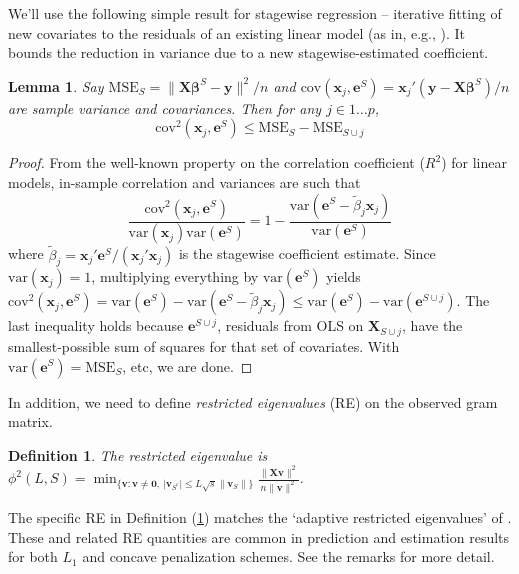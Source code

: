 \documentclass[12pt]{article}
\newtheorem{definition}{\sc Definition}[section]
\newtheorem{lemma}{\sc Lemma}[section]
\newcommand{\bs}[1]{\boldsymbol{#1}}
\newcommand{\mr}[1]{\mathrm{#1}}
\newcommand{\bm}[1]{\mathbf{#1}}
\begin{document}
We'll use the following simple result for stagewise regression -- iterative fitting of new covariates to the residuals of an existing linear model (as in, e.g., \citealt{goldberger_stepwise_1961}). It bounds the reduction in variance due to a new stagewise-estimated coefficient.
\begin{lemma}\label{SSElemma}
Say $\mr{MSE}_S = \|\bm{X}\bs{\beta}^S-\bm{y}\|^2/n$ and 
$\mr{cov}(\bs{x}_j,\bm{e}^S) = \bs{x}_j'(\bm{y}-\bm{X}\bs{\beta}^S)/n$ are sample variance and covariances.  Then for any $j \in 1\ldots p$, 
\[
\mr{cov}^2(\bs{x}_j,\bm{e}^S) \leq \mr{MSE}_S - \mr{MSE}_{S\cup j}
\]
\end{lemma}
\begin{proof}
From the well-known property on the correlation coefficient ($R^2$) for linear models,   
in-sample correlation and variances are such that
\[
\frac{\mr{cov}^2(\bs{x}_j,\bm{e}^S)}{\mr{var}(\bs{x}_j)\mr{var}(\bm{e}^S)} = 1 - \frac{\mr{var}(\bm{e}^S-\tilde\beta_j\bs{x}_j)}{\mr{var}(\bm{e}^S)}
\]
where $\tilde\beta_j = \bs{x}_j'\bm{e}^S/(\bs{x}_j'\bs{x}_j)$ is the stagewise coefficient estimate.  Since $\mr{var}(\bs{x}_j)=1$, multiplying everything by $\mr{var}(\bm{e}^S)$ yields $\mr{cov}^2(\bs{x}_j,\bm{e}^S) =
\mr{var}(\bm{e}^S) - \mr{var}(\bm{e}^S-\tilde\beta_j\bs{x}_j)
\leq \mr{var}(\bm{e}^S) - \mr{var}(\bm{e}^{S\cup j})$.
The last inequality holds because $\bm{e}^{S\cup j}$, residuals from OLS on $\bm{X}_{S\cup j}$, have the smallest-possible sum of squares for that set of covariates.  With $\mr{var}(\bm{e}^S) = \mr{MSE}_S$, etc, we are done.
\end{proof}

In addition, we need to define {\it restricted eigenvalues} (RE) on the observed gram matrix.  
\begin{definition}\label{redef}
The restricted eigenvalue is
$
\phi^2(L,S) = \min_{\{\bm{v}: \bm{v}\neq \bm{0},~|\bm{v}_{S^c}| \leq L\sqrt{s}\|\bm{v}_S\|\}}\frac{\|\bm{X}\bm{v}\|^2}{n\|\bm{v}\|^2}$.
\end{definition}
\noindent The specific RE in Definition (\ref{redef}) matches the `adaptive restricted eigenvalues' of \cite{buhlmann_statistics_2011}.  These and related RE quantities are common in prediction and estimation results for both $L_1$ and concave penalization schemes.  See the remarks for more detail.
\end{document}

